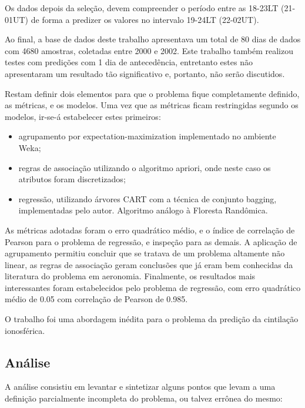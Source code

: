 Os dados depois da seleção, devem compreender o período  entre as 18-23LT (21-01UT) de forma a predizer os valores no intervalo 19-24LT (22-02UT).

Ao final, a base de dados deste trabalho apresentava um total de 80 dias de dados com 4680 amostras, coletadas entre 2000 e 2002. Este trabalho também realizou testes com predições com 1 dia de antecedência, entretanto estes não apresentaram um resultado tão significativo e, portanto, não serão discutidos.

Restam definir dois elementos para que o problema fique completamente definido, as métricas, e os modelos. Uma vez que as métricas ficam restringidas segundo os modelos, ir-se-á estabelecer estes primeiros:

\begin{itemize}
\item agrupamento por expectation-maximization implementado no ambiente Weka;
\item regras de associação utilizando o algoritmo apriori, onde neste caso os atributos foram discretizados;
\item regressão, utilizando árvores CART com a técnica de conjunto bagging, implementadas pelo autor. Algoritmo análogo à Floresta Randômica.
\end{itemize}

As métricas adotadas foram o erro quadrático médio, e o índice de correlação de Pearson para o problema de regressão, e inspeção para as demais. A aplicação de agrupamento permitiu concluir que se tratava de um problema altamente não linear, as regras de associação geram conclusões que já eram bem conhecidas da literatura do problema em aeronomia. Finalmente, os resultados mais interessantes foram estabelecidos pelo problema de regressão, com erro quadrático médio de 0.05 com correlação de Pearson de 0.985.

O trabalho foi uma abordagem inédita para o problema da predição da cintilação ionosférica.

\subsection{Análise}

A análise consistiu em levantar e sintetizar alguns pontos que levam a uma definição parcialmente incompleta do problema, ou talvez errônea do mesmo:

